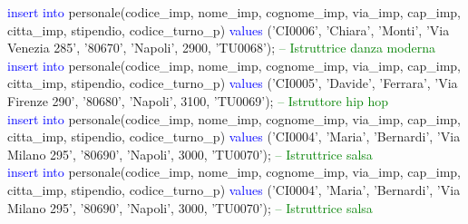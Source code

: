 \documentclass{article}
\begin{document}
\begin{flushleft}
{        \vspace{2mm}
        \hspace*{0.5em}\textcolor{blue}{insert into} personale(codice\_imp, nome\_imp, cognome\_imp, via\_imp, cap\_imp, \hspace*{0.5em}citta\_imp, stipendio, codice\_turno\_p) \textcolor{blue}{values} ('CI0006', 'Chiara', 'Monti', 'Via \hspace*{0.5em}Venezia 285', \hspace*{0.5em}'80670', 'Napoli', 2900, 'TU0068'); \hspace*{0.5em} \textcolor{green}{-- Istruttrice danza moderna} \\
        \vspace{2mm}
        \hspace*{0.5em}\textcolor{blue}{insert into} personale(codice\_imp, nome\_imp, cognome\_imp, via\_imp, cap\_imp, \hspace*{0.5em}citta\_imp, stipendio, codice\_turno\_p) \textcolor{blue}{values} ('CI0005', 'Davide', 'Ferrara', 'Via \hspace*{0.5em}Firenze 290', \hspace*{0.5em}'80680', 'Napoli', 3100, 'TU0069'); \hspace*{0.5em} \textcolor{green}{-- Istruttore hip hop} \\
        \vspace{2mm}
        \hspace*{0.5em}\textcolor{blue}{insert into} personale(codice\_imp, nome\_imp, cognome\_imp, via\_imp, cap\_imp, \hspace*{0.5em}citta\_imp, stipendio, codice\_turno\_p) \textcolor{blue}{values} ('CI0004', 'Maria', 'Bernardi', 'Via\hspace*{0.5em} Milano 295', \hspace*{0.5em}'80690', 'Napoli', 3000, 'TU0070'); \hspace*{0.5em} \textcolor{green}{-- Istruttrice salsa} \\
        \hspace*{0.5em}\textcolor{blue}{insert into} personale(codice\_imp, nome\_imp, cognome\_imp, via\_imp, cap\_imp, \hspace*{0.5em}citta\_imp, stipendio, codice\_turno\_p) \textcolor{blue}{values} ('CI0004', 'Maria', 'Bernardi', 'Via Milano 295', \hspace*{0.5em}'80690', 'Napoli', 3000, 'TU0070'); \hspace*{0.5em} \textcolor{green}{-- Istruttrice salsa} \\
}
\end{flushleft}
\end{document}
